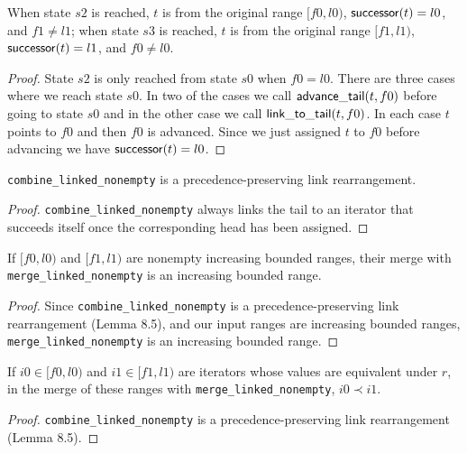 \begin{lemma}
	When state $s2$ is reached, $t$ is from the original range $[f0, l0)$, $\mathsf{successor}(t) = l0$, and
	$f1 \neq l1$; when state $s3$ is reached, $t$ is from the original range $[f1, l1)$,
	$\mathsf{successor}(t) = l1$, and $f0 \neq l0$.
\end{lemma}

\begin{proof}
	State $s2$ is only reached from state $s0$ when $f0 = l0$. There are three cases where we reach state
	$s0$. In two of the cases we call $\mathsf{advance\_tail}(t, f0)$ before going to state $s0$ and in the other
	case we call $\mathsf{link\_to\_tail}(t, f0)$. In each case $t$ points to $f0$ and then $f0$ is advanced.
	Since we just assigned $t$ to $f0$ before advancing we have $\mathsf{successor}(t) = l0$.
\end{proof}

\begin{lemma}
	\verb|combine_linked_nonempty| is a precedence-preserving link rearrangement.
\end{lemma}

\begin{proof}
	\verb|combine_linked_nonempty| always links the tail to an iterator that succeeds itself once the
	corresponding head has been assigned.
\end{proof}

\begin{lemma}
	If $[f0, l0)$ and $[f1, l1)$ are nonempty increasing bounded ranges, their merge with
	\verb|merge_linked_nonempty| is an increasing bounded range.
\end{lemma}

\begin{proof}
	Since \verb|combine_linked_nonempty| is a precedence-preserving link rearrangement (Lemma 8.5), and
	our input ranges are increasing bounded ranges, \verb|merge_linked_nonempty| is an increasing bounded
	range.
\end{proof}

\begin{lemma}
	If $i0 \in [f0, l0)$ and $i1 \in [f1, l1)$ are iterators whose values are equivalent under $r$, in the
	merge of these ranges with \verb|merge_linked_nonempty|, $i0 \prec i1$.
\end{lemma}

\begin{proof}
	\verb|combine_linked_nonempty| is a precedence-preserving link rearrangement (Lemma 8.5).
\end{proof}

